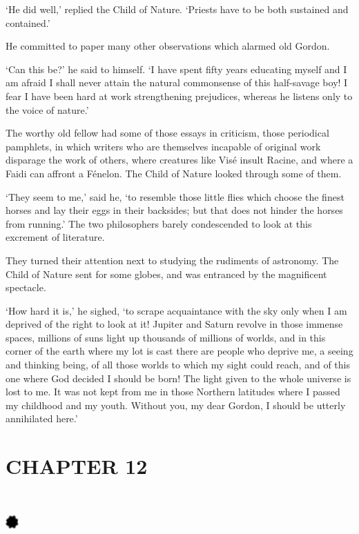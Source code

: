 \documentclass{article}
\begin{document}
\begin{center}
`He did well,' replied the Child of Nature. `Priests have to be both sustained 
and contained.' 

He committed to paper many other observations which alarmed old Gordon. 

`Can this be?' he said to himself. `I have spent fifty years educating myself and 
I am afraid I shall never attain the natural commonsense of this half-savage boy! 
I fear I have been hard at work strengthening prejudices, whereas he listens only 
to the voice of nature.' 

The worthy old fellow had some of those essays in criticism, those periodical pamphlets, 
in which writers who are themselves incapable of original work disparage the work 
of others, where creatures like Visé insult Racine, and where a Faidi can affront 
a Fénelon. The Child of Nature looked through some of them. 

`They seem to me,' said he, `to resemble those little flies which choose the finest 
horses and lay their eggs in their backsides; but that does not hinder the horses 
from running.' The two philosophers barely condescended to look at this excrement 
of literature. 

They turned their attention next to studying the rudiments of astronomy. The Child 
of Nature sent for some globes, and was entranced by the magnificent spectacle. 

`How hard it is,' he sighed, `to scrape acquaintance with the sky only when I am 
deprived of the right to look at it! Jupiter and Saturn revolve in those immense 
spaces, millions of suns light up thousands of millions of worlds, and in this 
corner of the earth where my lot is cast there are people who deprive me, a seeing 
and thinking being, of all those worlds to which my sight could reach, and of this 
one where God decided I should be born! The light given to the whole universe is 
lost to me. It was not kept from me in those Northern latitudes where I passed 
my childhood and my youth. Without you, my dear Gordon, I should be utterly annihilated 
here.'\pagebreak{} 

\section*{\textbf{CHAPTER 12 }}

\section*{%
\includegraphics[width=14pt, height=15pt, keepaspectratio=true]{Zadig or L'Ingenu - Voltaire-fig034.jpg}
}


\end{center}
\end{document}
